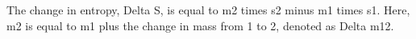 The change in entropy, Delta S, is equal to m2 times s2 minus m1 times s1. Here, m2 is equal to m1 plus the change in mass from 1 to 2, denoted as Delta m12.